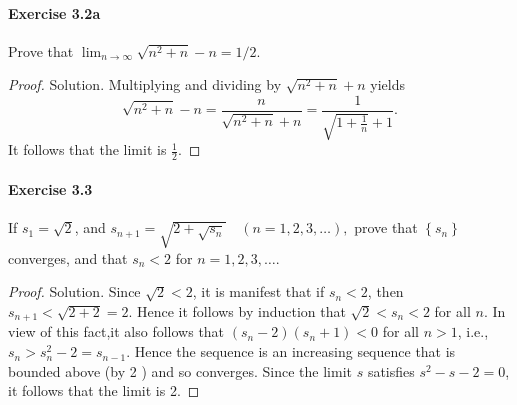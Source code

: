 \documentclass{article}
\theoremstyle{definition}
\begin{document}
\paragraph{Exercise 3.2a} Prove that $\lim_{n \rightarrow \infty}\sqrt{n^2 + n} -n = 1/2$.
\begin{proof}
    Solution. Multiplying and dividing by $\sqrt{n^2+n}+n$ yields
$$
\sqrt{n^2+n}-n=\frac{n}{\sqrt{n^2+n}+n}=\frac{1}{\sqrt{1+\frac{1}{n}}+1} .
$$
It follows that the limit is $\frac{1}{2}$.
\end{proof}


\paragraph{Exercise 3.3} If $s_{1}=\sqrt{2}$, and $s_{n+1}=\sqrt{2+\sqrt{s_{n}}} \quad(n=1,2,3, \ldots),$ prove that $\left\{s_{n}\right\}$ converges, and that $s_{n}<2$ for $n=1,2,3, \ldots$.
\begin{proof}
    Solution. Since $\sqrt{2}<2$, it is manifest that if $s_n<2$, then $s_{n+1}<\sqrt{2+2}=2$. Hence it follows by induction that $\sqrt{2}<s_n<2$ for all $n$. In view of this fact,it also follows that $\left(s_n-2\right)\left(s_n+1\right)<0$ for all $n>1$, i.e., $s_n>s_n^2-2=s_{n-1}$. Hence the sequence is an increasing sequence that is bounded above (by 2 ) and so converges. Since the limit $s$ satisfies $s^2-s-2=0$, it follows that the limit is 2.
\end{proof}
\end{document}
